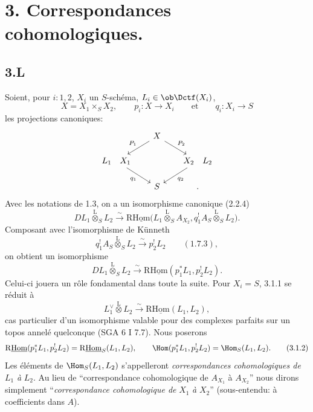 \clearpage
\section*{3. Correspondances cohomologiques.}

\subsection*{3.L}
Soient, pour $i:1,2$, $X_i$ un $S$-schéma, $L_i\in\ob\Dctf(X_i)$,
\[
X=X_1\times_S X_2,
\qquad
p_i:X\longrightarrow X_i
\qquad\text{et}\qquad
q_i:X_i\longrightarrow S
\]
les projections canoniques:
\[
\begin{tikzcd}[column sep=1.8em,row sep=1.5em]
& X \arrow[dl,"P_1"'] \arrow[dr,"P_2"] & \\
L_1\quad X_1 \arrow[dr,"q_1"'] & & X_2\quad L_2 \arrow[dl,"q_2"] \\
& S & .
\end{tikzcd}
\]
Avec les notations de 1.3, on a un isomorphisme canonique (2.2.4)
\[
DL_1\overset{\mathrm{L}}{\otimes}_S L_2
\xrightarrow{\sim}
\mathrm{R}\underline{\mathrm{Hom}}\bigl(L_1\overset{\mathrm{L}}{\otimes}_S A_{X_2},
q_1^!A_S\overset{\mathrm{L}}{\otimes}_S L_2\bigr).
\]
Composant avec l'isomorphisme de Künneth
\[
q_1^!A_S\overset{\mathrm{L}}{\otimes}_S L_2
\xrightarrow{\sim}p_2^!L_2 \qquad (1.7.3),
\]
on obtient un isomorphisme
\begin{equation}
DL_1\overset{\mathrm{L}}{\otimes}_S L_2
\xrightarrow{\sim}
\mathrm{R}\underline{\mathrm{Hom}}(p_1^*L_1,p_2^!L_2).
\tag{3.1.1}
\end{equation}
Celui-ci jouera un rôle fondamental dans toute la suite. Pour $X_i=S$, 3.1.1 se réduit à
\[
L_1^\vee\overset{\mathrm{L}}{\otimes}L_2\xrightarrow{\sim}\mathrm{R}\underline{\mathrm{Hom}}(L_1,L_2),
\]
cas particulier d'un isomorphisme valable pour des complexes parfaits sur un topos annelé quelconque (SGA 6 I 7.7). Nous poserons
\begin{equation}
\mathrm{R}\underline{\mathrm{Hom}}(p_1^*L_1,p_2^!L_2)=\mathrm{R}\underline{\mathrm{Hom}}_S(L_1,L_2),
\qquad
\Hom(p_1^*L_1,p_2^!L_2)=\Hom_S(L_1,L_2).
\tag{3.1.2}
\end{equation}
Les éléments de $\Hom_S(L_1,L_2)$ s'appelleront \emph{correspondances cohomologiques de} $L_1$ \emph{à} $L_2$. Au lieu de ``correspondance cohomologique de $A_{X_1}$ à $A_{X_2}$'' nous dirons simplement ``\emph{correspondance cohomologique de} $X_1$ \emph{à} $X_2$'' (sous-entendu: à coefficients dans $A$).


